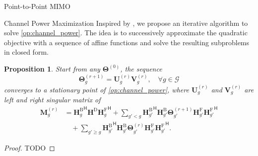 \documentclass[journal]{IEEEtran}
\newtheorem{proposition}{Proposition}
\begin{document}
\begin{section}{Point-to-Point MIMO}
\begin{subsection}{Channel Power Maximization}
		Inspired by \cite{Nie2017}, we propose an iterative algorithm to solve \eqref{op:channel_power}.
		The idea is to successively approximate the quadratic objective with a sequence of affine functions and solve the resulting subproblems in closed form.

		\begin{proposition}
			Start from any $\mathbf{\Theta}^{(0)}$, the sequence
			\begin{equation}
				\mathbf{\Theta}_g^{(r+1)} = \mathbf{U}_g^{(r)} \mathbf{V}_g^{(r)}, \quad \forall g \in \mathcal{G}
			\end{equation}
			converges to a stationary point of \eqref{op:channel_power}, where $\mathbf{U}_g^{(r)}$ and $\mathbf{V}_g^{(r)}$ are left and right singular matrix of
			\begin{equation}
				\begin{split}
					\mathbf{M}_g^{(r)}
					& = {\mathbf{H}_g^\mathrm{B}}^\mathsf{H} \mathbf{H}^\mathrm{D} {\mathbf{H}_g^\mathrm{F}}^\mathsf{H} + \sum_{g' < g} {\mathbf{H}_{g'}^\mathrm{B}}^\mathsf{H} \mathbf{H}_{g'}^\mathrm{B} \mathbf{\Theta}_{g'}^{(r+1)} \mathbf{H}_{g'}^\mathrm{F} {\mathbf{H}_{g'}^\mathrm{F}}^\mathsf{H} \\
					& \quad + \sum_{g' \ge g} {\mathbf{H}_{g'}^\mathrm{B}}^\mathsf{H} \mathbf{H}_{g'}^\mathrm{B} \mathbf{\Theta}_{g'}^{(r)} \mathbf{H}_{g'}^\mathrm{F} {\mathbf{H}_{g'}^\mathrm{F}}^\mathsf{H}.
				\end{split}
			\end{equation}
		\end{proposition}

		\begin{proof}
			TODO
		\end{proof}


\end{subsection}
\end{section}
\end{document}
